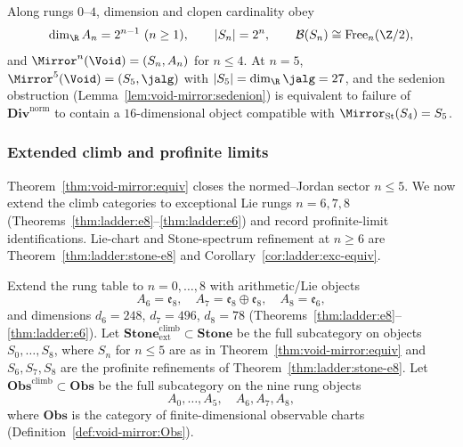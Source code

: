 \begin{corollary}\label{cor:void-mirror:dictionary}
Along rungs $0$--$4$, dimension and clopen cardinality obey
\[
  \dim_{\R}A_n=2^{n-1}\ (n\geq1),\qquad |S_n|=2^n,\qquad
  \mathcal{B}(S_n)\cong\mathrm{Free}_n(\Z/2),
\]
and $\Mirror^n(\Void)=(S_n,A_n)$ for $n\leq4$. At $n=5$,
$\Mirror^5(\Void)=(S_5,\jalg)$ with $|S_5|=\dim_{\R}\jalg=27$, and the
sedenion obstruction (Lemma~\ref{lem:void-mirror:sedenion}) is equivalent to
failure of $\mathbf{Div}^{\mathrm{norm}}$ to contain a $16$-dimensional object
compatible with $\Mirror_{\mathrm{St}}(S_4)=S_5$.
\end{corollary}

\subsubsection{Extended climb and profinite limits}
\label{sec:void-mirror:equiv-ext}

Theorem~\ref{thm:void-mirror:equiv} closes the normed--Jordan sector
$n\leq5$. We now extend the climb categories to exceptional Lie rungs
$n=6,7,8$ (Theorems~\ref{thm:ladder:e8}--\ref{thm:ladder:e6}) and record
profinite-limit identifications. Lie-chart and Stone-spectrum refinement at
$n\geq6$ are Theorem~\ref{thm:ladder:stone-e8} and
Corollary~\ref{cor:ladder:exc-equiv}.

\begin{definition}\label{def:void-mirror:climb-ext}
Extend the rung table to $n=0,\ldots,8$ with arithmetic/Lie objects
\[
  A_6=\mathfrak{e}_8,\quad A_7=\mathfrak{e}_8\oplus\mathfrak{e}_8,\quad
  A_8=\mathfrak{e}_6,
\]
and dimensions $d_6=248$, $d_7=496$, $d_8=78$
(Theorems~\ref{thm:ladder:e8}--\ref{thm:ladder:e6}).
Let $\mathbf{Stone}^{\mathrm{climb}}_{\mathrm{ext}}\subset\mathbf{Stone}$
be the full subcategory on objects $S_0,\ldots,S_8$, where $S_n$ for $n\leq5$
are as in Theorem~\ref{thm:void-mirror:equiv} and $S_6,S_7,S_8$ are the
profinite refinements of Theorem~\ref{thm:ladder:stone-e8}. Let
$\mathbf{Obs}^{\mathrm{climb}}\subset\mathbf{Obs}$ be the full subcategory
on the nine rung objects
\[
  A_0,\ldots,A_5,\quad A_6,A_7,A_8,
\]
where $\mathbf{Obs}$ is the category of finite-dimensional observable charts
(Definition~\ref{def:void-mirror:Obs}).
\end{definition}

